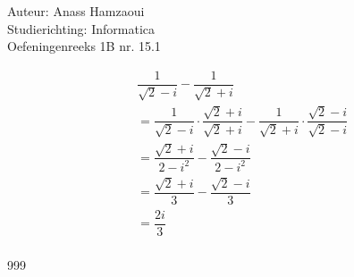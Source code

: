 \documentclass[a4paper]{article}
\begin{document}
  
\noindent \large Auteur: Anass Hamzaoui \\
\noindent \large Studierichting: Informatica \\
\noindent \large Oefeningenreeks 1B nr. 15.1 \\

\medskip

\normalsize

\begin{eqnarray*}
    && \dfrac{1}{\sqrt{2}-i} - \dfrac{1}{\sqrt{2}+i} \\
    && = \dfrac{1}{\sqrt{2}-i} \cdot \dfrac{\sqrt{2}+i}{\sqrt{2}+i} - \dfrac{1}{\sqrt{2}+i} \cdot \dfrac{\sqrt{2}-i}{\sqrt{2}-i} \\
    && = \dfrac{\sqrt{2}+i}{2-i^2} - \dfrac{\sqrt{2}-i}{2-i^2} \\
    && = \dfrac{\sqrt{2}+i}{3} - \dfrac{\sqrt{2}-i}{3} \\
    && = \dfrac{2i}{3} \\
\end{eqnarray*}

\begin{thebibliography}{999}
\end{thebibliography}
\end{document}
